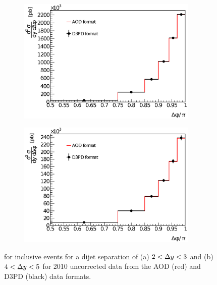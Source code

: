 \begin{figure}
\centering
        \begin{subfigure}[b]{0.5\textwidth}
                \centering
                \includegraphics[height = 6cm,width=\textwidth]{figures/GBJ2/AODD3PD/Comp_dPhi__2_3-Edit.eps}
        \end{subfigure}%
        \begin{subfigure}[b]{0.5\textwidth}
                \centering
                \includegraphics[height = 6cm,width=\textwidth]{figures/GBJ2/AODD3PD/Comp_dPhi__4_5-Edit.eps}
        \end{subfigure}%
\caption[Comparison of \dphiDist{} between AOD data format and D3PD data format]{
\dphiDist{} for inclusive events for a dijet separation of (a) $2<\mbox{$\Delta y$}{}<3$ and (b) $4<\mbox{$\Delta y$}{}<5$ for 2010 uncorrected data from the AOD (red) and D3PD (black) data formats.
\label{GBJ2:AODD3PD:dphi}}
\end{figure}

